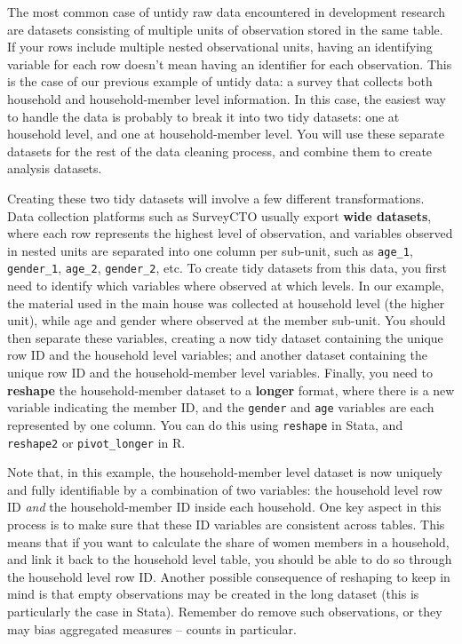 The most common case of untidy raw data encountered in development research
are datasets consisting of multiple units of observation stored in the same table. 
If your rows include multiple nested observational units,
having an identifying variable for each row doesn't mean having an identifier for each observation.
This is the case of our previous example of untidy data:
a survey that collects both household and household-member level information.
In this case, 
the easiest way to handle the data is probably to break it into two tidy datasets:
one at household level, and one at household-member level.
You will use these separate datasets for the rest of the data cleaning process,
and combine them to create analysis datasets.

Creating these two tidy datasets will involve a few different transformations.
Data collection platforms such as SurveyCTO usually export \textbf{wide datasets},
where each row represents the highest level of observation,
and variables observed in nested units are separated into one column per sub-unit,
such as \texttt{age\_1}, \texttt{gender\_1}, \texttt{age\_2}, \texttt{gender\_2}, etc.
To create tidy datasets from this data,
you first need to identify which variables where observed at which levels.
In our example, the material used in the main house was collected at household level (the higher unit),
while age and gender where observed at the member sub-unit.
You should then separate these variables,
creating a now tidy dataset containing the unique row ID and the household level variables;
and another dataset containing the unique row ID and the household-member level variables.
Finally, you need to \textbf{reshape}
the household-member dataset to a \textbf{longer} format,
where there is a new variable indicating the member ID,
and the \texttt{gender} and \texttt{age} variables are each represented by one column.
You can do this using \texttt{reshape} in Stata, and \texttt{reshape2} or \texttt{pivot\_longer} in R.

Note that, in this example, 
the household-member level dataset is now uniquely and fully identifiable
by a combination of two variables:
the household level row ID \textit{and} the household-member ID inside each household.
One key aspect in this process is to make sure that these ID variables are consistent across tables.
This means that if you want to calculate the share of women members in a household,
and link it back to the household level table, 
you should be able to do so through the household level row ID.
Another possible consequence of reshaping to keep in mind is that
empty observations may be created in the long dataset
(this is particularly the case in Stata).
Remember do remove such observations,
or they may bias aggregated measures -- counts in particular.

